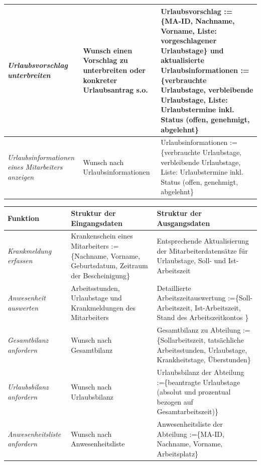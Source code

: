 {\begin{tabular}{|p{3cm}|p{6cm}|p{6cm}|}
	\hline
		\textit{Urlaubsvorschlag \newline unterbreiten} &
		Wunsch einen Vorschlag zu unterbreiten oder konkreter Urlaubsantrag s.o.&
		Urlaubsvorschlag := \{MA-ID, Nachname, Vorname, Liste: vorgeschlagener Urlaubstage\} und aktualisierte Urlaubsinformationen := \{verbrauchte Urlaubstage, verbleibende Urlaubstage, Liste: Urlaubstermine inkl. Status (offen, genehmigt, abgelehnt\}\\
	\hline
		\textit{Urlaubsinformationen eines Mitarbeiters an\-zeigen} &
		Wunsch nach Urlaubsinformationen &
		Urlaubsinformationen := \{verbrauchte Urlaubstage, verbleibende Urlaubstage, Liste: Urlaubstermine inkl. Status (offen, genehmigt, abgelehnt\}\\
	\hline 
\end{tabular}
}

{
\hspace{-2cm}
\footnotesize
\begin{tabular}{|p{3cm}|p{6cm}|p{6cm}|}
	\hline
		\textbf{Funktion	} &	
		\textbf{Struktur der Eingangsdaten} &
		\textbf{Struktur der Ausgangsdaten} \\
	\hline \hline	
		\textit{Krankmeldung erfassen} &
		Krankenschein eines \newline Mitarbeiters := \{Nachname, Vorname, Geburtsdatum, Zeitraum der Bescheinigung\} &
		Entsprechende Aktualisierung der Mitarbeiterdatens\"atze f\"ur Urlaubstage, Soll- und Ist-Arbeitszeit \\
	\hline \hline
		\textit{Anwesenheit \newline auswerten} &
		Arbeitsstunden, Urlaubstage und Krankmeldungen des Mitarbeiters&
		Detaillierte Arbeitszeitauswertung :=\{Soll-Arbeitszeit, Ist-Arbeitszeit, Stand des Arbeitszeitkontos \} \\
	\hline \hline
		\textit{Gesamtbilanz \newline anfordern} &
		Wunsch nach Gesamtbilanz &
		Gesamtbilanz zu Abteilung :=\{Sollarbeitszeit, tats\"achliche Arbeitsstunden, Urlaubstage, Krankheitstage, \"Uberstunden\}\\
	\hline
		\textit{Urlaubsbilanz \newline anfordern} &
		Wunsch nach Urlaubsbilanz&
		Urlaubsbilanz der Abteilung :=\{beantragte Urlaubstage (absolut und prozentual bezogen auf Gesamtarbeitszeit)\}\\
	\hline
		\textit{Anwesenheitsliste \newline anfordern} &
		Wunsch nach Anwesenheitsliste &
		Anwesenheitsliste der Abteilung :=\{MA-ID, Nachname, Vorname, Arbeitsplatz\} \\
	\hline
\end{tabular}
}


